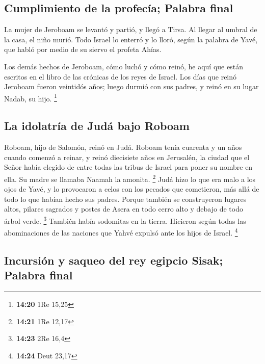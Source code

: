 \hypertarget{cumplimiento-de-la-profecuxeda-palabra-final}{%
\subsection{Cumplimiento de la profecía; Palabra
final}\label{cumplimiento-de-la-profecuxeda-palabra-final}}

 La mujer de Jeroboam se levantó y partió, y llegó a
Tirsa. Al llegar al umbral de la casa, el niño murió. 
Todo Israel lo enterró y lo lloró, según la palabra de Yavé, que habló
por medio de su siervo el profeta Ahías.

 Los demás hechos de Jeroboam, cómo luchó y cómo reinó,
he aquí que están escritos en el libro de las crónicas de los reyes de
Israel.  Los días que reinó Jeroboam fueron veintidós
años; luego durmió con sus padres, y reinó en su lugar Nadab, su hijo.
\footnote{\textbf{14:20} 1Re 15,25}

\hypertarget{la-idolatruxeda-de-juduxe1-bajo-roboam}{%
\subsection{La idolatría de Judá bajo
Roboam}\label{la-idolatruxeda-de-juduxe1-bajo-roboam}}

 Roboam, hijo de Salomón, reinó en Judá. Roboam tenía
cuarenta y un años cuando comenzó a reinar, y reinó diecisiete años en
Jerusalén, la ciudad que el Señor había elegido de entre todas las
tribus de Israel para poner su nombre en ella. Su madre se llamaba
Naamah la amonita. \footnote{\textbf{14:21} 1Re 12,17} 
Judá hizo lo que era malo a los ojos de Yavé, y lo provocaron a celos
con los pecados que cometieron, más allá de todo lo que habían hecho sus
padres.  Porque también se construyeron lugares altos,
pilares sagrados y postes de Asera en todo cerro alto y debajo de todo
árbol verde. \footnote{\textbf{14:23} 2Re 16,4}  También
había sodomitas en la tierra. Hicieron según todas las abominaciones de
las naciones que Yahvé expulsó ante los hijos de Israel. \footnote{\textbf{14:24}
  Deut 23,17}

\hypertarget{incursiuxf3n-y-saqueo-del-rey-egipcio-sisak-palabra-final}{%
\subsection{Incursión y saqueo del rey egipcio Sisak; Palabra
final}\label{incursiuxf3n-y-saqueo-del-rey-egipcio-sisak-palabra-final}}

